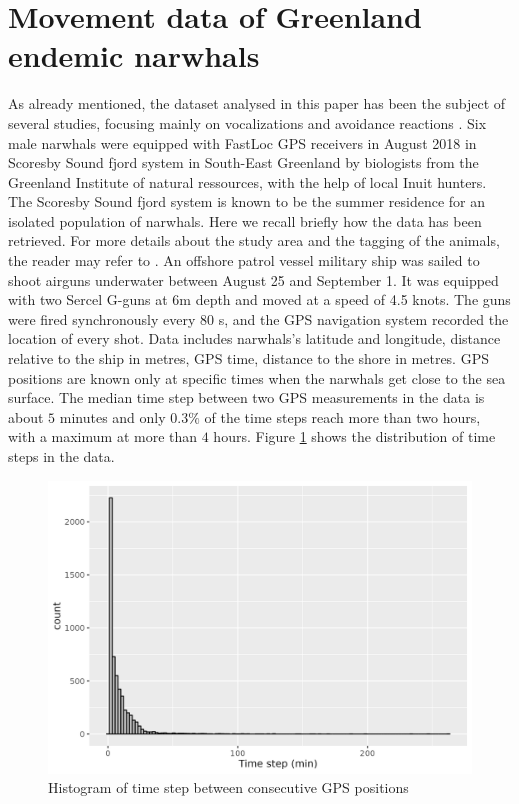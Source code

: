 \documentclass[11pt]{article}
\newcommand {\1}{\mathbb{1}}
\begin{document}
\section{Movement data of Greenland endemic narwhals}
As already mentioned, the dataset analysed in this paper has been the subject of several studies, focusing mainly on vocalizations and avoidance reactions \cite{heide-jorgensen_behavioral_2021,tervo_narwhals_2021}. 
Six male narwhals were equipped with FastLoc GPS receivers in August 2018 in Scoresby Sound fjord system in South-East Greenland by biologists from the Greenland Institute of natural ressources, with the help of local Inuit hunters. The Scoresby Sound fjord system
is known to be the summer residence for an isolated population of narwhals.
Here we recall briefly how the data has been retrieved. For more details about the study area and the tagging of the animals, the reader may refer to \cite{heide-jorgensen_behavioral_2021}. 
An offshore patrol vessel military ship was sailed to shoot airguns underwater between August 25 and September 1. It was equipped with two Sercel G-guns at 6m depth and moved at a speed of 4.5 knots. The guns were fired synchronously every 80 s,
and the GPS navigation system recorded the
location of every shot. 
Data includes narwhals's latitude and longitude, distance relative to the ship in metres, GPS time, distance to the shore in metres. GPS positions are known only at specific times when the narwhals get close to the sea surface. The median time step between two GPS measurements in the data is about $5$ minutes and only $0.3 \%$ of the time steps reach more than two hours, with a maximum at more than $4$ hours. Figure \ref{fig:alltimestepshisto} shows the distribution of time steps in the data.

\begin{figure}[H]
	\centering
	\includegraphics[scale=0.5]{images/data_exploration/all_time_steps_histo}
	\caption{Histogram of time step between consecutive GPS positions}
	\label{fig:alltimestepshisto}
\end{figure}
\end{document}
